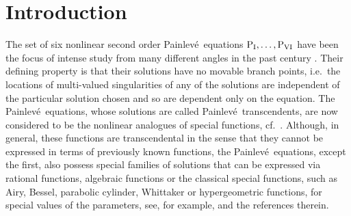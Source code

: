 \documentclass[10pt]{amsart}
\theoremstyle{definition}
\numberwithin{equation}{section}
\numberwithin{figure}{section}
\newcommand{\comment}[1]{}
\newcommand{\p}{Painlev\'{e}}
\def\d{{\rm d}}
\newcommand{\deriv}[3][]{\frac{\d^{#1}{#2}}{{\d{#3}}^{#1}}}
\renewcommand{\a}{\alpha}
\begin{document}
\maketitle
\section{Introduction}

The set of six nonlinear second order \p\ equations ${\rm P_I,\dots,P_{VI}}$ 
\comment{\begin{align}
\label{eq:P1}
\deriv[2]{u}{z}&=6u^2+z,\\
\label{eq:P2}
\deriv[2]{u}{z}&=2u^3+zu+\a,\\
\label{eq:P3}
\deriv[2]{u}{z}&=\frac{1}{u}\left(\deriv{u}{z}\right)^2-\frac{1}{z}\deriv{u}{z}
+\frac{\a u^2+\beta}{z}+\gamma u^3+\frac{\delta}{u},\\
\label{eq:P4}
\deriv[2]{u}{z}&=\frac{1}{2u}\left(\deriv{u}{z}\right)^2
+\frac32u^3+4zu^2+2(z^2-\a)u+\frac{\beta}{u},\\
\label{eq:P5}
\deriv[2]{u}{z}&=\left(\frac{1}{2u}+\frac{1}{u-1}\right)\left(\deriv{u}{z}\right)^2-\frac{1}{z}\deriv{u}{z}
+ \frac{(u-1)^2}{z^2}\left(\a u+\frac{\beta}{u}\right) +
\frac{\gamma u}{z}+\frac{\delta u(u+1)}{u-1},\\
\label{eq:P6}
\deriv[2]{u}{z}&= \frac{1}{2}\left(\frac{1}{u} +
\frac{1}{u-1} + \frac{1}{u-z}\right)\!\left(\deriv{u}{z}\right)^{2} - 
\left(\frac{1}{z} + \frac{1}{z-1} + \frac{1}{u-z}\right)\! \deriv{u}{z}\\
&\qquad\qquad+\frac{u(u-1)(u-z)}{z^2(z-1)^2}\left\{\a +
\frac{\beta z}{u^2} + \frac{\gamma (z-1)}{(u-1)^2} + 
\frac{\delta z(z-1)}{(u-z)^2}\right\},\nonumber
\end{align}
with $\a$, $\beta$, $\gamma$ and $\delta$ constants,}%
have been the focus of intense study from
many different angles in the past century \cite{refPAC06review,gromak2008painleve}.
Their defining property is that their solutions have no movable branch points, i.e.\ the locations of multi-valued singularities of any of the solutions are independent of the particular solution chosen and so are dependent only on the equation.
The \p\ equations, whose solutions are called \p\ transcendents, are now considered to be the nonlinear analogues of special functions, cf.~\cite{clarkson2003painleve,refPAC06review,refFIKNbook}. 
Although, in general, these functions are transcendental in the sense that they cannot be expressed in terms of previously known functions, the \p\ equations, except the first, also possess special families of solutions that can be expressed via rational functions, algebraic functions or the classical special functions, such as Airy, Bessel, parabolic cylinder, Whittaker or hypergeometric functions, for special values of the parameters, see, for example, \cite{refPAC06review,gromak2008painleve} and the references therein.
\end{document}
